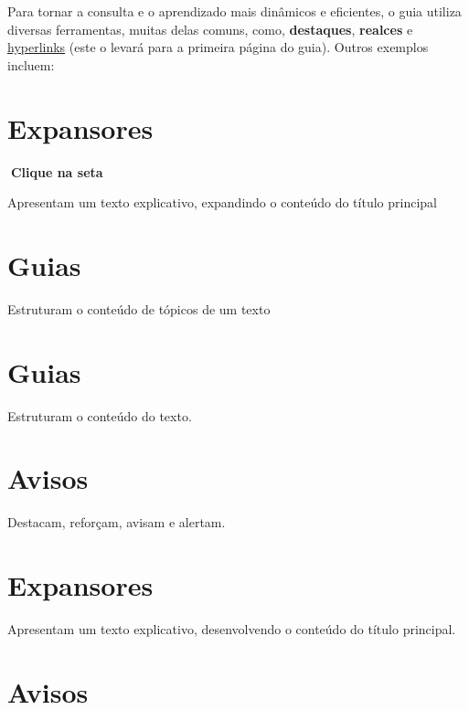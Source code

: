 \documentclass[
  letterpaper,
  DIV=11,
  numbers=noendperiod]{scrreprt}
\begin{document}
Para tornar a consulta e o aprendizado mais dinâmicos e eficientes, o
guia utiliza diversas ferramentas, muitas delas comuns, como,
\textbf{destaques}, {\textbf{realces}} e
\protect\hyperlink{bem-vindo}{hyperlinks} (este o levará para a primeira
página do guia). Outros exemplos incluem:

\hypertarget{expansores}{%
\section{Expansores}\label{expansores}}

\begin{tcolorbox}[enhanced jigsaw, bottomrule=.15mm, arc=.35mm, breakable, toprule=.15mm, rightrule=.15mm, opacityback=0, left=2mm, colback=white, leftrule=.75mm]

\textbf{🔽{Clique na seta}}\vspace{2mm}

Apresentam um texto explicativo, expandindo o conteúdo do título
principal

\end{tcolorbox}

\hypertarget{guias}{%
\section{Guias}\label{guias}}

Estruturam o conteúdo de tópicos de um texto

\section{Guias}

Estruturam o conteúdo do texto.

\section{Avisos}

Destacam, reforçam, avisam e alertam.

\section{Expansores}

Apresentam um texto explicativo, desenvolvendo o conteúdo do título
principal.

\hypertarget{avisos-1}{%
\section{Avisos}\label{avisos-1}}
\end{document}
